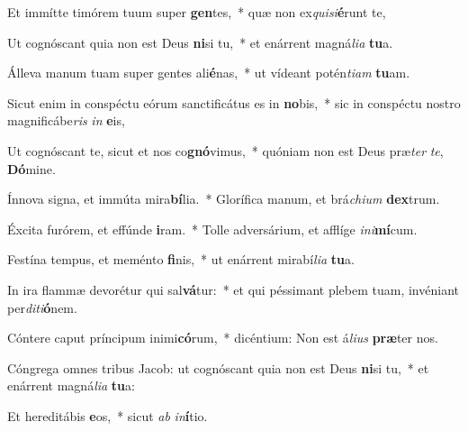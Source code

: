 \item Et immítte timórem tuum super \textbf{gen}tes,~* quæ non ex\textit{qui}\textit{si}\textbf{é}runt te,
\item Ut cognóscant quia non est Deus \textbf{ni}si tu,~* et enárrent magná\textit{li}\textit{a} \textbf{tu}a.
\item Álleva manum tuam super gentes ali\textbf{é}nas,~* ut vídeant potén\textit{ti}\textit{am} \textbf{tu}am.
\item Sicut enim in conspéctu eórum sanctificátus es in \textbf{no}bis,~* sic in conspéctu nostro magnificábe\textit{ris} \textit{in} \textbf{e}is,
\item Ut cognóscant te, sicut et nos co\textbf{gnó}vimus,~* quóniam non est Deus præ\textit{ter} \textit{te}, \textbf{Dó}mine.
\item Ínnova signa, et immúta mira\textbf{bí}lia.~* Glorífica manum, et brá\textit{chi}\textit{um} \textbf{dex}trum.
\item Éxcita furórem, et effúnde \textbf{i}ram.~* Tolle adversárium, et afflíge \textit{in}\textit{i}\textbf{mí}cum.
\item Festína tempus, et meménto \textbf{fi}nis,~* ut enárrent mirabí\textit{li}\textit{a} \textbf{tu}a.
\item In ira flammæ devorétur qui sal\textbf{vá}tur:~* et qui péssimant plebem tuam, invéniant per\textit{di}\textit{ti}\textbf{ó}nem.
\item Cóntere caput príncipum inimi\textbf{có}rum,~* dicéntium: Non est á\textit{li}\textit{us} \textbf{præ}ter nos.
\item Cóngrega omnes tribus Jacob: ut cognóscant quia non est Deus \textbf{ni}si tu,~* et enárrent magná\textit{li}\textit{a} \textbf{tu}a:
\item Et hereditábis \textbf{e}os,~* sicut \textit{ab} \textit{in}\textbf{í}tio.
